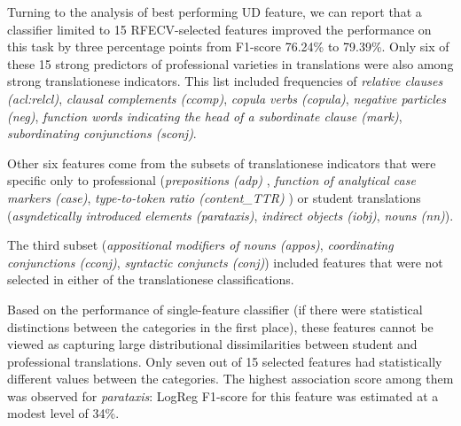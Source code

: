 
Turning to the analysis of best performing UD feature, we can report that a classifier limited to 15 RFECV-selected features improved the performance on this task by three percentage points from F1-score 76.24\% to 79.39\%. %
Only six of these 15 strong predictors of professional varieties in translations were also among strong translationese indicators. This list included frequencies of \textit{relative clauses (acl:relcl)}, \textit{clausal complements (ccomp)}, \textit{copula verbs (copula)}, \textit{negative particles (neg)}, \textit{function words indicating the head of a subordinate clause (mark)}, \textit{subordinating conjunctions (sconj)}.

Other six features come from the subsets of translationese indicators that were specific only to professional (\textit{prepositions (adp)} , \textit{function of analytical case markers (case)}, \textit{type-to-token ratio (content\_TTR)} ) or student translations (\textit{asyndetically introduced elements (parataxis)}, \textit{indirect objects (iobj)}, \textit{nouns (nn)}).

The third subset (\textit{appositional modifiers of nouns (appos)}, \textit{coordinating conjunctions (cconj)}, \textit{syntactic conjuncts (conj)}) included features that were not selected in either of the translationese classifications.

Based on the performance of single-feature classifier (if there were statistical distinctions between the categories in the first place), these features cannot be viewed as capturing large distributional dissimilarities between student and professional translations. 
Only seven out of 15 selected features had statistically different values between the categories. The highest association score among them was observed for \textit{parataxis}: LogReg F1-score for this feature was estimated at a modest level of 34\%. 

